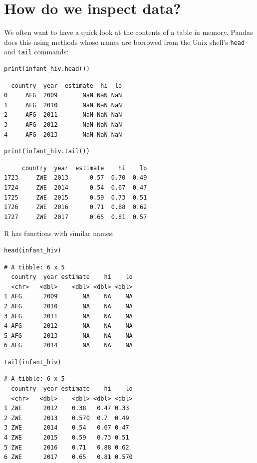 \section{How do we inspect data?}

We often want to have a quick look at the contents of a table in memory.
Pandas does this using methods
whose names are borrowed from the Unix shell's \texttt{head} and \texttt{tail} commands:

\begin{lstlisting}
print(infant_hiv.head())
\end{lstlisting}

\begin{lstlisting}
  country  year  estimate  hi  lo
0     AFG  2009       NaN NaN NaN
1     AFG  2010       NaN NaN NaN
2     AFG  2011       NaN NaN NaN
3     AFG  2012       NaN NaN NaN
4     AFG  2013       NaN NaN NaN
\end{lstlisting}

\begin{lstlisting}
print(infant_hiv.tail())
\end{lstlisting}

\begin{lstlisting}
     country  year  estimate    hi    lo
1723     ZWE  2013      0.57  0.70  0.49
1724     ZWE  2014      0.54  0.67  0.47
1725     ZWE  2015      0.59  0.73  0.51
1726     ZWE  2016      0.71  0.88  0.62
1727     ZWE  2017      0.65  0.81  0.57
\end{lstlisting}

R has functions with similar names:

\begin{lstlisting}
head(infant_hiv)
\end{lstlisting}

\begin{lstlisting}
# A tibble: 6 x 5
  country  year estimate    hi    lo
  <chr>   <dbl>    <dbl> <dbl> <dbl>
1 AFG      2009       NA    NA    NA
2 AFG      2010       NA    NA    NA
3 AFG      2011       NA    NA    NA
4 AFG      2012       NA    NA    NA
5 AFG      2013       NA    NA    NA
6 AFG      2014       NA    NA    NA
\end{lstlisting}

\begin{lstlisting}
tail(infant_hiv)
\end{lstlisting}

\begin{lstlisting}
# A tibble: 6 x 5
  country  year estimate    hi    lo
  <chr>   <dbl>    <dbl> <dbl> <dbl>
1 ZWE      2012    0.38   0.47 0.33 
2 ZWE      2013    0.570  0.7  0.49 
3 ZWE      2014    0.54   0.67 0.47 
4 ZWE      2015    0.59   0.73 0.51 
5 ZWE      2016    0.71   0.88 0.62 
6 ZWE      2017    0.65   0.81 0.570
\end{lstlisting}

